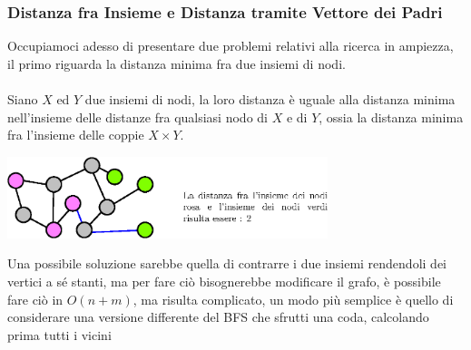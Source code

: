 \documentclass[12pt, letterpaper]{article}
\newcommand{\acc}{\\\hphantom{}\\}
\begin{document}
\subsubsection{Distanza fra Insieme e Distanza tramite Vettore dei Padri}
Occupiamoci adesso di presentare due problemi relativi alla ricerca in ampiezza, il primo riguarda la distanza minima fra
due insiemi di nodi.\acc
Siano $X$ ed $Y$ due insiemi di nodi, la loro distanza è uguale alla distanza minima nell'insieme delle distanze fra qualsiasi
nodo di $X$ e di $Y$, ossia la distanza minima fra l'insieme delle coppie $X\times Y$. \begin{center}
    \includegraphics[width=0.7\textwidth ]{images/distInsiemi.eps}
\end{center}
Una possibile soluzione sarebbe quella di contrarre i due insiemi rendendoli dei vertici a sé stanti, ma per fare ciò
bisognerebbe modificare il grafo, è possibile fare ciò in $O(n+m)$, ma risulta complicato, un modo più semplice è
quello di considerare una versione differente del BFS che sfrutti una coda, calcolando prima tutti i vicini
\end{document}
